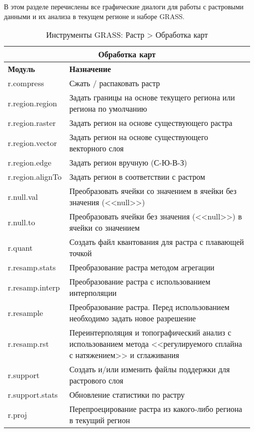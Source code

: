 В этом разделе перечислены все графические диалоги для работы с
растровыми данными и их анализа в текущем регионе и наборе GRASS.

{\renewcommand{\arraystretch}{0.7}
\begin{table}[H]
\centering
 \begin{tabular}{|p{4cm}|p{10cm}|}
  \hline \multicolumn{2}{|c|}{\textbf{Обработка карт}} \\
  \hline \textbf{Модуль} & \textbf{Назначение} \\
  \hline r.compress & Сжать / распаковать растр \\
  \hline r.region.region & Задать границы на основе текущего региона
  или региона по умолчанию \\
  \hline r.region.raster & Задать регион на основе существующего растра \\
  \hline r.region.vector & Задать регион на основе существующего векторного
  слоя \\
  \hline r.region.edge & Задать регион вручную (С-Ю-В-З) \\
  \hline r.region.alignTo & Задать регион в соответствии с растром \\
  \hline r.null.val & Преобразовать ячейки со значением в ячейки без
  значения (<<null>>) \\
  \hline r.null.to & Преобразовать ячейки без значения (<<null>>) в ячейки
  со значением \\
  \hline r.quant & Создать файл квантования для растра с плавающей точкой \\
  \hline r.resamp.stats & Преобразование растра методом агрегации \\
  \hline r.resamp.interp & Преобразование растра с использованием
  интерполяции \\
  \hline r.resample & Преобразование растра. Перед использованием
  необходимо задать новое разрешение \\
  \hline r.resamp.rst & Переинтерполяция и топографический анализ с
  использованием метода <<регулируемого сплайна с натяжением>> и
  сглаживания \\
  \hline r.support &Создать и/или изменить файлы поддержки для
  растрового слоя \\
  \hline r.support.stats & Обновление статистики по растру \\
  \hline r.proj & Перепроецирование растра из какого-либо региона в
  текущий регион \\
\hline
\end{tabular}
\caption{Инструменты GRASS: Растр > Обработка карт}
\end{table}}

